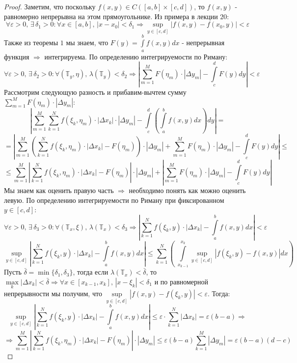 \documentclass[12pt]{article}
\newcommand{\MTB}{\mathbb{T}}
\newcommand{\VE}{\varepsilon}
\theoremstyle{definition}
\newcommand{\ddsum}[2]{\displaystyle\sum\limits_{#1}^{#2}}
\newcommand{\ddint}[2]{\displaystyle\int\limits_{#1}^{#2}}
\begin{document}
\begin{proof}
	Заметим, что поскольку $f(x,y) \in C([a,b]\times [c,d])$, то $f(x,y)$ - равномерно непрерывна на этом прямоугольнике. Из примера в лекции $20$:
	$$
		\forall \VE > 0, \, \exists \, \delta_1 > 0 \colon \forall x \in [a,b], \, |x - x_0| < \delta_1 \Rightarrow \sup\limits_{y \in [c,d]}|f(x,y) - f(x_0,y)| < \VE
	$$
	Также из теоремы $1$ мы знаем, что $F(y) = \ddint{a}{b}f(x,y)dx$ - непрерывная функция $\Rightarrow$ интегрируема. По определению интегрируемости по Риману:
	$$
		\forall \VE > 0,\, \exists \, \delta_2 > 0 \colon \forall (\MTB_y, \eta), \, \lambda(\MTB_y) < \delta_2 \Rightarrow \left|\ddsum{m = 1}{M}F(\eta_m){\cdot}|\Delta y_m| - \ddint{c}{d}F(y)dy \right| < \VE
	$$
	Рассмотрим следующую разность и прибавим-вычтем сумму $\ddsum{m = 1}{M}F(\eta_m){\cdot}|\Delta y_m|$:
	$$
		\left|\ddsum{m = 1}{M}\ddsum{k = 1}{N}f(\xi_k,\eta_m){\cdot}|\Delta x_k|{\cdot}|\Delta y_m| - \ddint{c}{d}\left(\ddint{a}{b}f(x,y)dx\right)dy \right| = 
	$$
	$$
		= \left|\ddsum{m = 1}{M}\left(\ddsum{k = 1}{N}f(\xi_k,\eta_m){\cdot}|\Delta x_k| - F(\eta_m)\right){\cdot}|\Delta y_m|  + \ddsum{m = 1}{M}F(\eta_m){\cdot}|\Delta y_m| -  \ddint{c}{d}F(y)dy \right| \leq
	$$
	$$
		\leq \ddsum{m = 1}{M}\left|\ddsum{k = 1}{N}f(\xi_k,\eta_m){\cdot}|\Delta x_k| - F(\eta_m)\right|{\cdot}|\Delta y_m| + \left|\ddsum{m = 1}{M}F(\eta_m){\cdot}|\Delta y_m| -  \ddint{c}{d}F(y)dy \right|
	$$
	Мы знаем как оценить правую часть $\Rightarrow$ необходимо понять как можно оценить левую. По определению интегрируемости по Риману при фиксированном $y \in [c,d]$:
	$$
		\forall \VE > 0,\, \exists \, \delta_3 > 0 \colon \forall (\MTB_x, \xi), \, \lambda(\MTB_x) < \delta_3 \Rightarrow \left|\ddsum{k = 1}{N}f(\xi_k,y){\cdot}|\Delta x_k| - \ddint{a}{b}f(x,y)dx \right| < \VE
	$$
	$$
		\sup\limits_{y \in [c,d]}\left|\ddsum{k = 1}{N}f(\xi_k,y){\cdot}|\Delta x_k| - \ddint{a}{b}f(x,y)dx \right| \leq \ddsum{k = 1}{N} \left(\;\ddint{x_{k-1}}{x_k}\sup\limits_{y \in [c,d]}\left|f(\xi_k,y) - f(x,y)\right|dx\right)
	$$
	Пусть $\bar{\delta} = \min\{\delta_1,\delta_3\}$, тогда если $\lambda(\MTB_x) < \bar{\delta}$, то $\max\limits_{k}|\Delta x_k| < \bar{\delta} \Rightarrow \forall x \in [x_{k-1}, x_k], \, |x - \xi_k| < \delta_1$ и по равномерной непрерывности мы получим, что $\sup\limits_{y \in [c,d]}|f(x,y) - f(\xi_k,y)|< \VE$. Тогда:
	$$
		\sup\limits_{y \in [c,d]}\left|\ddsum{k = 1}{N}f(\xi_k,y){\cdot}|\Delta x_k| - \ddint{a}{b}f(x,y)dx \right| \leq \VE {\cdot}\ddsum{k = 1}{N}|\Delta x_k| = \VE (b-a) \Rightarrow
	$$
	$$
		\Rightarrow \ddsum{m = 1}{M}\left|\ddsum{k = 1}{N}f(\xi_k,\eta_m){\cdot}|\Delta x_k| - F(\eta_m)\right|{\cdot}|\Delta y_m| \leq \VE(b-a)\ddsum{k = 1}{M}|\Delta y_m| = \VE (b-a)(d - c)
$$
\end{proof}
\end{document}
